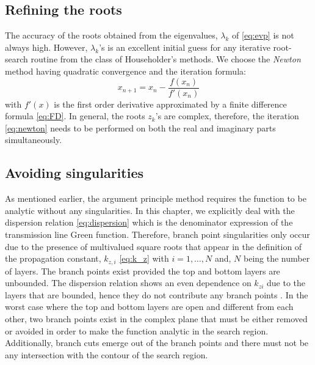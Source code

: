\documentclass[12pt]{article}
\begin{document}
\subsection{Refining the roots}
%
The accuracy of the roots obtained from the eigenvalues, $\lambda_k$ of \eqref{eq:evp} is not always high. However, $\lambda_k$'s is an excellent initial guess for any iterative root-search routine from the class of Householder's methods. We choose the \emph{Newton} method \cite{press2007numerical} having quadratic convergence and the iteration formula:
%
\begin{equation}
  x_{n+1} = x_n - \frac {f(x_n)}{f'(x_n)}
  \label{eq:newton}
\end{equation}
%
with $f'(x)$ is the first order derivative approximated by a finite difference formula \eqref{eq:FD}. In general, the roots $z_k$'s are complex, therefore, the iteration \eqref{eq:newton} needs to be performed on both the real and imaginary parts simultaneously.
\subsection{Avoiding singularities}
%
As mentioned earlier, the argument principle method requires the function to be analytic without any singularities. In this chapter, we explicitly deal with the dispersion relation \eqref{eq:dispersion} which is the denominator expression of the transmission line Green function. Therefore, branch point singularities only occur due to the presence of multivalued square roots that appear in the definition of the propagation constant, $k_{z,i}$ \eqref{eq:k_z} with $i =1,\dots, N$ and, $N$ being the number of layers. The branch points exist provided the top and bottom layers are unbounded. The dispersion relation shows an even dependence on $k_{zi}$ due to the layers that are bounded, hence they do not  contribute any branch points \cite[Section~5.3a]{felsen1994}. In the worst case where the top and bottom layers are open and different from each other, two branch points exist in the complex plane that must be either removed or avoided in order to make the function analytic in the search region. Additionally, branch cuts emerge out of the branch points and there must not be any intersection with the contour of the search region.
\end{document}
